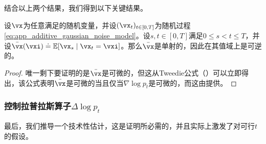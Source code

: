 \documentclass[../../book-main.tex]{subfiles}
\begin{document}
结合以上两个结果，我们得到以下关键结果。

\begin{corollary}\label{cor:gribonval_A2}
    设\(\vx\)为任意满足的随机变量，并设\((\vx_{t})_{t \in [0, T]}\)为随机过程\eqref{eq:app_additive_gaussian_noise_model}。设\(s, t \in [0, T]\)满足\(0 \leq s < t \leq T\)，并设\(\bar{\vx}(\vxi) \doteq \Ex[\vx_{s} \mid \vx_{t} = \vxi]\)。那么\(\bar{\vx}\)是单射的，因此在其值域上是可逆的。
\end{corollary}
\begin{proof}
    唯一剩下要证明的是\(\bar{\vx}\)是可微的，但这从Tweedie公式（）可以立即得出，该公式表明\(\bar{\vx}\)是可微的当且仅当\(\nabla \log p_{t}\)是可微的，而这由提供。
\end{proof}

\subsubsection{控制拉普拉斯算子\(\Delta \log p_{t}\)}

最后，我们推导一个技术性估计，这是证明所必需的，并且实际上激发了对可行\(t\)的假设。
\end{document}
